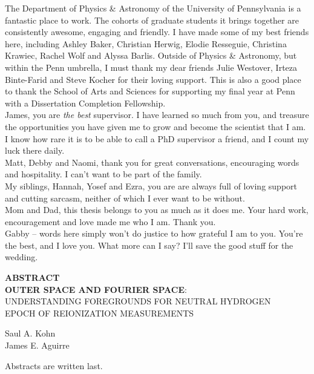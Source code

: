 \documentclass[12pt,twoside,openany]{book}
\newcommand{\tita}{{\bf OUTER SPACE AND FOURIER SPACE}:\\UNDERSTANDING FOREGROUNDS FOR NEUTRAL HYDROGEN\\EPOCH OF REIONIZATION MEASUREMENTS}
\begin{document}
\noindent
The Department of Physics \& Astronomy of the University of Pennsylvania is a fantastic place to work. The cohorts of graduate students it brings together are consistently awesome, engaging and friendly. I have made some of my best friends here, including Ashley Baker, Christian Herwig, Elodie Resseguie, Christina Krawiec, Rachel Wolf and Alyssa Barlis. Outside of Physics \& Astronomy, but within the Penn umbrella, I must thank my dear friends Julie Westover, Irteza Binte-Farid and Steve Kocher for their loving support. This is also a good place to thank the School of Arts and Sciences for supporting my final year at Penn with a Dissertation Completion Fellowship.\\

\noindent
James, you are \textit{the best} supervisor. I have learned so much from you, and treasure the opportunities you have given me to grow and become the scientist that I am. I know how rare it is to be able to call a PhD supervisor a friend, and I count my luck there daily.\\

\noindent
Matt, Debby and Naomi, thank you for great conversations, encouraging words and hospitality. I can't want to be part of the family.\\

\noindent
My siblings, Hannah, Yosef and Ezra, you are are always full of loving support and cutting sarcasm, neither of which I ever want to be without.\\

\noindent
Mom and Dad, this thesis belongs to you as much as it does me. Your hard work, encouragement and love made me who I am. Thank you.\\

\noindent
Gabby -- words here simply won't do justice to how grateful I am to you. You're the best, and I love you. What more can I say? I'll save the good stuff for the wedding.



\newpage
\vspace*{.15 in}
\begin{center}
{\bf ABSTRACT}\\
\tita \\
\parskip=0.2in


Saul A. Kohn\\
James E. Aguirre
\end{center}
\noindent
Abstracts are written last.
\end{document}
